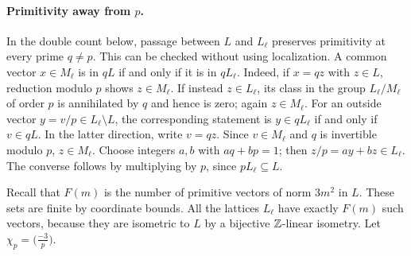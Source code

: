 \paragraph{Primitivity away from $p$.}
In the double count below, passage between $L$ and $L_\ell$ preserves
primitivity at every prime $q\ne p$. This can be checked without using
localization. A common vector $x\in M_\ell$ is in $qL$ if and only
if it is in $qL_\ell$. Indeed, if $x=qz$ with $z\in L$, reduction
modulo $p$ shows $z\in M_\ell$. If instead $z\in L_\ell$, its
class in the group $L_\ell/M_\ell$ of order $p$ is annihilated by
$q$ and hence is zero; again $z\in M_\ell$. For an
outside vector $y=v/p\in L_\ell\setminus L$, the corresponding
statement is $y\in qL_\ell$ if and only if $v\in qL$. In the latter
direction, write $v=qz$. Since $v\in M_\ell$ and $q$ is invertible
modulo $p$, $z\in M_\ell$. Choose integers $a,b$ with $aq+bp=1$;
then $z/p=ay+bz\in L_\ell$. The converse follows by multiplying by
$p$, since $pL_\ell\subseteq L$.

Recall that $F(m)$ is the number of primitive vectors of norm $3m^2$ in
$L$. These sets are finite by coordinate bounds. All the lattices
$L_\ell$ have exactly $F(m)$ such vectors, because they are
isometric to $L$ by a bijective $\mathbb Z$-linear isometry. Let
$\chi_p=\bigl(\frac{-3}{p}\bigr)$.

